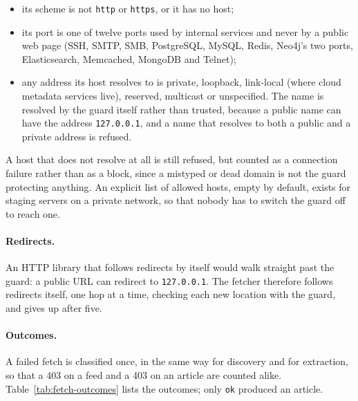 \begin{itemize}
    \item its scheme is not \texttt{http} or \texttt{https}, or it has
    no host;
    \item its port is one of twelve ports used by internal services and
    never by a public web page (SSH, SMTP, SMB, PostgreSQL, MySQL,
    Redis, Neo4j's two ports, Elasticsearch, Memcached, MongoDB and
    Telnet);
    \item any address its host resolves to is private, loopback,
    link-local (where cloud metadata services live), reserved,
    multicast or unspecified. The name is resolved by the guard itself
    rather than trusted, because a public name can have the address
    \texttt{127.0.0.1}, and a name that resolves to both a public and a
    private address is refused.
\end{itemize}

A host that does not resolve at all is still refused, but counted as a
connection failure rather than as a block, since a mistyped or dead
domain is not the guard protecting anything. An explicit list of
allowed hosts, empty by default, exists for staging servers on a
private network, so that nobody has to switch the guard off to reach
one.

\paragraph{Redirects.} An HTTP library that follows redirects by
itself would walk straight past the guard: a public URL can redirect
to \texttt{127.0.0.1}. The fetcher therefore follows redirects itself,
one hop at a time, checking each new location with the guard, and
gives up after five.

\paragraph{Outcomes.} A failed fetch is classified once, in the same
way for discovery and for extraction, so that a 403 on a feed and a
403 on an article are counted alike. Table~\ref{tab:fetch-outcomes}
lists the outcomes; only \texttt{ok} produced an article.

